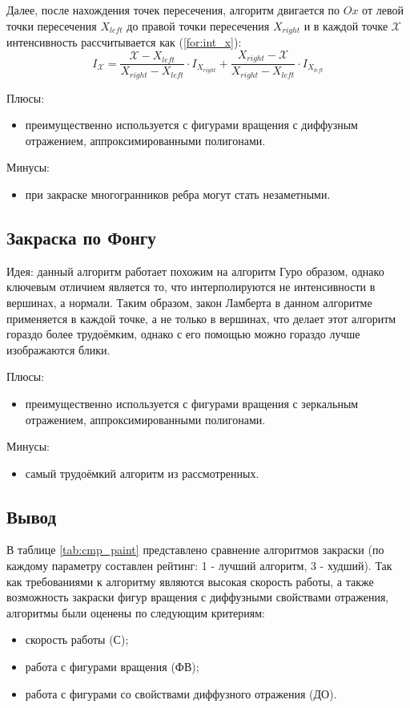 Далее, после нахождения точек пересечения, алгоритм двигается по $Ox$ от левой точки пересечения $X_{left}$ до правой точки пересечения $X_{right}$ и в каждой точке $\mathcal{X}$ интенсивность рассчитывается как (\ref{for:int_x}):
\begin{equation}
    \label{for:int_x}
    I_{\mathcal{X}} = \frac{\mathcal{X} - X_{left}}{X_{right} - X_{left}} \cdot I_{X_{right}} + \frac{X_{right} - \mathcal{X}}{X_{right} - X_{left}} \cdot I_{X_{left}}
\end{equation}

Плюсы:
\begin{itemize}
    \item преимущественно используется с фигурами вращения с диффузным отражением, аппроксимированными полигонами.
\end{itemize}

Минусы:
\begin{itemize}
    \item при закраске многогранников ребра могут стать незаметными.
\end{itemize}

\subsection{Закраска по Фонгу}
Идея: данный алгоритм работает похожим на алгоритм Гуро образом, однако ключевым отличием является то, что интерполируются не интенсивности в вершинах, а нормали\cite{lmodels}. Таким образом, закон Ламберта в данном алгоритме применяется в каждой точке, а не только в вершинах, что делает этот алгоритм гораздо более трудоёмким, однако с его помощью можно гораздо лучше изображаются блики.

Плюсы:
\begin{itemize}
    \item преимущественно используется с фигурами вращения с зеркальным отражением, аппроксимированными полигонами.
\end{itemize}

Минусы:
\begin{itemize}
    \item самый трудоёмкий алгоритм из рассмотренных\cite{rogers}.
\end{itemize}

\subsection*{Вывод}

В таблице \ref{tab:cmp_paint} представлено сравнение алгоритмов\cite{rogers} закраски (по каждому параметру составлен рейтинг: 1 - лучший алгоритм, 3 - худший). Так как требованиями к алгоритму являются высокая скорость работы, а также возможность закраски фигур вращения с диффузными свойствами отражения, алгоритмы были оценены по следующим критериям:
\begin{itemize}
    \item скорость работы (С);
    \item работа с фигурами вращения (ФВ);
    \item работа с фигурами со свойствами диффузного отражения (ДО).
\end{itemize}

